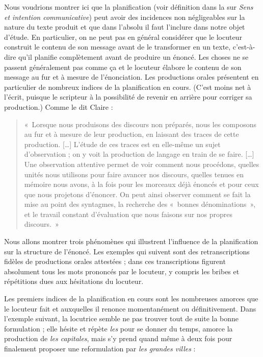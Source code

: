 Nous voudrions montrer ici que la planification (voir définition dans la  sur \textit{Sens et intention communicative}) peut avoir des incidences non négligeables sur la nature du texte produit et que dans l’absolu il faut l’inclure dans notre objet d’étude. En particulier, on ne peut pas en général considérer que le locuteur construit le contenu de son message avant de le transformer en un texte, c’est-à-dire qu’il planifie complètement avant de produire un énoncé. Les choses ne se passent généralement pas comme ça et le locuteur élabore le contenu de son message au fur et à mesure de l’énonciation. Les productions orales présentent en particulier de nombreux indices de la planification en cours. (C’est moins net à l’écrit, puisque le scripteur à la possibilité de revenir en arrière pour corriger sa production.) Comme le dit Claire \citet[17]{blanche-benveniste1990francais}:
\begin{quote}
«~Lorsque nous produisons des discours non préparés, nous les composons au fur et à mesure de leur production, en laissant des traces de cette production. […] L’étude de ces traces est en elle-même un sujet d’observation ; on y voit la production de langage en train de se faire. […] Une observation attentive permet de voir comment nous procédons, quelles unités nous utilisons pour faire avancer nos discours, quelles tenues en mémoire nous avons, à la fois pour les morceaux déjà énoncés et pour ceux que nous projetons d’énoncer. On peut ainsi observer comment se fait la mise au point des syntagmes, la recherche des «~bonnes dénominations~», et le travail constant d’évaluation que nous faisons sur nos propres discours.~»\end{quote}

Nous allons montrer trois phénomènes qui illustrent l’influence de la planification sur la structure de l’énoncé. Les exemples qui suivent sont des retranscriptions fidèles de productions orales attestées ; dans ces transcriptions figurent absolument tous les mots prononcés par le locuteur, y compris les bribes et répétitions dues aux hésitations du locuteur.

Les premiers indices de la planification en cours sont les nombreuses amorces que le locuteur fait et auxquelles il renonce momentanément ou définitivement. Dans l’exemple suivant, la locutrice semble ne pas trouver tout de suite la bonne formulation ; elle hésite et répète \textit{les} pour se donner du temps, amorce la production de \textit{les capitales}, mais s’y prend quand même à deux fois pour finalement proposer une reformulation par \textit{les grandes villes} :\largerpage[2]

